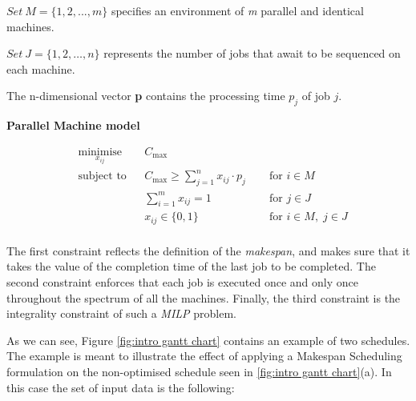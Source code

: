 \vspace{\baselineskip}
{\addtolength{\leftskip}{5mm}
\noindent
\( Set~M= \{ 1,2,...,m \}  \)  specifies an environment of \textit{m} parallel and identical machines. 

\vspace{\baselineskip}
\noindent
\( Set~J= \{ 1,2, \ldots ,n \}  \) represents the number of jobs that await to be sequenced on each machine.\par
 
 \vspace{\baselineskip}
 \noindent
The n-dimensional vector \textbf{p} contains the processing time \( p_{j} \) of job \( j .\)\par

}

\vspace{\baselineskip}
\noindent
\textbf{Parallel Machine model}

\vspace{\baselineskip}
\begin{equation}
\label{equation: makespan background}
\begin{aligned}
& \underset{x_{ij}}{\text{minimise}}
& & C_{\max } \\
& \text{subject to}
& &  C_{\max } \geq \sum _{j=1}^{n}x_{ij} \cdot p_{j}~~ \;\;\; &\text{for } i \in M\\
& & & \sum _{i=1}^{m}x_{ij} = 1\;\;\; &\text{for } j \in J\\
& & & x_{ij} \in  \{ 0,1 \} \;\;\; &\text{for } i \in M, \; j \in J\\
\end{aligned}
\end{equation}

\vspace{\baselineskip}
\noindent
The first constraint reflects the definition of the \textit{makespan}, and makes sure that it takes the value of the completion time of the last job to be completed. The second constraint enforces that each job is executed once and only once throughout the spectrum of all the machines. Finally, the third constraint is the integrality constraint of such a \textit{MILP} problem.   

\vspace{\baselineskip}
\noindent
As we can see, Figure \ref{fig:intro gantt chart} contains an example of two schedules\cite{DUMMY:2}. The example is meant to illustrate the effect of applying a Makespan Scheduling formulation on the non-optimised schedule seen in \ref{fig:intro gantt chart}(a). In this case the set of input data is the following:

